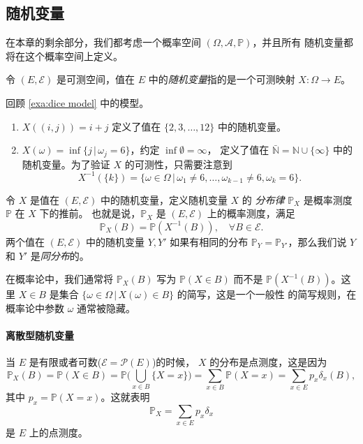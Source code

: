 \documentclass[fontset=none]{Notes}
\begin{document}
\subsection{随机变量}

在本章的剩余部分，我们都考虑一个概率空间 $(\Omega,\mathcal{A},\mathbb{P})$，并且所有
随机变量都将在这个概率空间上定义。

\begin{definition}
  令 $(E,\mathcal{E})$ 是可测空间，值在 $E$ 中的\emph{随机变量}指的是一个可测映射
  $X:\Omega\to E$。
\end{definition}

\begin{example}
  回顾 \eqref{exa:dice model} 中的模型。
  \begin{enumerate}
    \item $X((i,j))=i+j$ 定义了值在 $\{2,3,\dots,12\}$ 中的随机变量。
    \item $X(\omega)=\inf\{j\,|\, \omega_j=6\}$，约定 $\inf \emptyset=\infty$，
    定义了值在 $\bar{\mathbb{N}}=\mathbb{N}\cup\{\infty\}$ 中的随机变量。为了验证
    $X$ 的可测性，只需要注意到
    \[
      X^{-1}(\{k\})=\{\omega\in\Omega\,|\, \omega_1\neq 6,\dots,\omega_{k-1}\neq 6,\omega_k=6\}.
    \]
  \end{enumerate}
\end{example}

\begin{definition}
  令 $X$ 是值在 $(E,\mathcal{E})$ 中的随机变量，定义随机变量 $X$ 的
  \emph{分布律} $\mathbb{P}_X$ 是概率测度 $\mathbb{P}$ 在 $X$ 下的推前。
  也就是说，$\mathbb{P}_X$ 是 $(E,\mathcal{E})$ 上的概率测度，满足
  \[
    \mathbb{P}_X(B)=\mathbb{P}(X^{-1}(B)),\quad \forall B\in \mathcal{E}.
  \]
  两个值在 $(E,\mathcal{E})$ 中的随机变量 $Y,Y'$ 如果有相同的分布
  $\mathbb{P}_Y=\mathbb{P}_{Y'}$，那么我们说 $Y$ 和 $Y'$ 是\emph{同分布}的。
\end{definition}

在概率论中，我们通常将 $\mathbb{P}_X(B)$ 写为 $\mathbb{P}(X\in B)$
而不是 $\mathbb{P}(X^{-1}(B))$。这里 $X\in B$ 是集合
$\{\omega\in\Omega\,|\, X(\omega)\in B\}$ 的简写，这是一个一般性
的简写规则，在概率论中参数 $\omega$ 通常被隐藏。

\paragraph{离散型随机变量}
当 $E$ 是有限或者可数($\mathcal{E}=\mathcal{P}(E)$)的时候，
$X$ 的分布是点测度，这是因为
\[
  \mathbb{P}_X(B)=\mathbb{P}(X\in B)=\mathbb{P}\biggl(\bigcup_{x\in B}\{X=x\}\biggr)
  =\sum_{x\in B}\mathbb{P}(X=x)=\sum_{x\in E}p_x\delta_x(B),
\]
其中 $p_x=\mathbb{P}(X=x)$。这就表明
\[
  \mathbb{P}_X=\sum_{x\in E}p_x\delta_x 
\]
是 $E$ 上的点测度。
\end{document}
